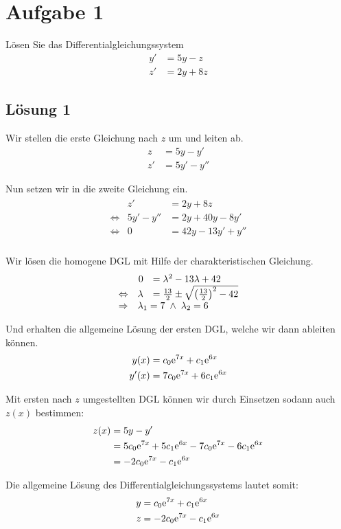 \documentclass[main.tex]{subfiles}
\begin{document}
\section{Aufgabe 1}
Lösen Sie das Differentialgleichungssystem
\begin{align*}
    y' &= 5y -  z \\
    z' &= 2y + 8z
\end{align*}

\subsection{Lösung 1}
Wir stellen die erste Gleichung nach $z$ um und leiten ab. 
\begin{align*}
    z  &= 5y - y' \\
    z' &= 5y' - y''
\end{align*}

Nun setzen wir in die zweite Gleichung ein.
\begin{align*}
\begin{array}{rrl}
                & z'        &= 2y + 8z \\
\Leftrightarrow & 5y' - y'' &= 2y + 40y - 8y' \\
\Leftrightarrow & 0 &= 42y - 13y' + y'' \\
\end{array}
\end{align*}

Wir lösen die homogene DGL mit Hilfe der charakteristischen Gleichung.
\begin{align*}
\begin{array}{rrl}
                & 0 &= \lambda^2 -13\lambda + 42 \\
\Leftrightarrow & \lambda &= \frac{13}{2} \pm \sqrt{\left(\frac{13}{2}\right)^2 - 42} \\
\Rightarrow & \multicolumn{2}{l}{\lambda_1 = 7 \;\land\; \lambda_2 = 6}
\end{array}
\end{align*}

Und erhalten die allgemeine Lösung der ersten DGL, welche wir dann ableiten können.
\begin{align*}
    y(x)  &= c_0 \mathrm{e}^{7x} + c_1 \mathrm{e}^{6x} \\
    y'(x) &= 7c_0 \mathrm{e}^{7x} + 6c_1 \mathrm{e}^{6x} \\
\end{align*}

Mit ersten nach $z$ umgestellten DGL können wir durch Einsetzen sodann auch $z(x)$ bestimmen:
\begin{align*}
    z(x) &= 5y - y' \\
         &= 5c_0 \mathrm{e}^{7x} + 5c_1 \mathrm{e}^{6x} - 7c_0 \mathrm{e}^{7x} - 6c_1 \mathrm{e}^{6x} \\
         &= -2c_0 \mathrm{e}^{7x} - c_1 \mathrm{e}^{6x}
\end{align*}

Die allgemeine Lösung des Differentialgleichungssystems lautet somit:
\begin{align*}
    y &= c_0 \mathrm{e}^{7x} + c_1 \mathrm{e}^{6x} \\
    z &= -2c_0 \mathrm{e}^{7x} - c_1 \mathrm{e}^{6x}
\end{align*}
\end{document}
